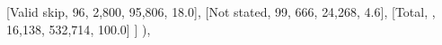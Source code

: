 \documentclass[
  11pt,
  a4paper,
]{article}
\newenvironment{Shaded}{\begin{snugshade}}{\end{snugshade}}
\newcommand{\NormalTok}[1]{\textcolor[rgb]{0.00,0.23,0.31}{#1}}
\newcommand{\StringTok}[1]{\textcolor[rgb]{0.13,0.47,0.30}{#1}}
\begin{document}
\begin{Shaded}
\begin{Highlighting}[]
\NormalTok{            [}\StringTok{\textquotesingle{}Valid skip\textquotesingle{}}\NormalTok{, }\StringTok{\textquotesingle{}96\textquotesingle{}}\NormalTok{, }\StringTok{\textquotesingle{}2,800\textquotesingle{}}\NormalTok{, }\StringTok{\textquotesingle{}95,806\textquotesingle{}}\NormalTok{, }\StringTok{\textquotesingle{}18.0\textquotesingle{}}\NormalTok{],}
\NormalTok{            [}\StringTok{\textquotesingle{}Not stated\textquotesingle{}}\NormalTok{, }\StringTok{\textquotesingle{}99\textquotesingle{}}\NormalTok{, }\StringTok{\textquotesingle{}666\textquotesingle{}}\NormalTok{, }\StringTok{\textquotesingle{}24,268\textquotesingle{}}\NormalTok{, }\StringTok{\textquotesingle{}4.6\textquotesingle{}}\NormalTok{],}
\NormalTok{            [}\StringTok{\textquotesingle{}Total\textquotesingle{}}\NormalTok{, }\StringTok{\textquotesingle{}\textquotesingle{}}\NormalTok{, }\StringTok{\textquotesingle{}16,138\textquotesingle{}}\NormalTok{, }\StringTok{\textquotesingle{}532,714\textquotesingle{}}\NormalTok{, }\StringTok{\textquotesingle{}100.0\textquotesingle{}}\NormalTok{]}
\NormalTok{        ]}
\NormalTok{    ),}


\end{Highlighting}
\end{Shaded}
\end{document}
